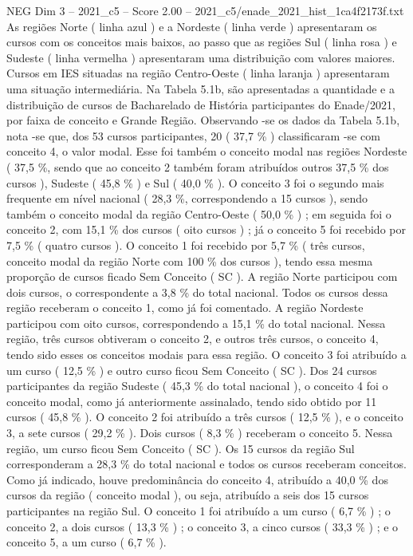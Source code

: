\begin{textsample}{NEG Dim 3 – 2021\_c5 – Score 2.00 – 2021\_c5/enade\_2021\_hist\_1ca4f2173f.txt}
As regiões Norte ( linha azul ) e a Nordeste ( linha verde ) apresentaram os cursos com os conceitos mais baixos, ao passo que as regiões Sul ( linha rosa ) e Sudeste ( linha vermelha ) apresentaram uma distribuição com valores maiores.
Cursos em IES situadas na região Centro-Oeste ( linha laranja ) apresentaram uma situação intermediária.
Na Tabela 5.1b, são apresentadas a quantidade e a distribuição de cursos de Bacharelado de História participantes do Enade/2021, por faixa de conceito e Grande Região.
Observando -se os dados da Tabela 5.1b, nota -se que, dos 53 cursos participantes, 20 ( 37,7 \% ) classificaram -se com conceito 4, o valor modal.
Esse foi também o conceito modal nas regiões Nordeste ( 37,5 \%, sendo que ao conceito 2 também foram atribuídos outros 37,5 \% dos cursos ), Sudeste ( 45,8 \% ) e Sul ( 40,0 \% ).
O conceito 3 foi o segundo mais frequente em nível nacional ( 28,3 \%, correspondendo a 15 cursos ), sendo também o conceito modal da região Centro-Oeste ( 50,0 \% ) ; em seguida foi o conceito 2, com 15,1 \% dos cursos ( oito cursos ) ; já o conceito 5 foi recebido por 7,5 \% ( quatro cursos ).
O conceito 1 foi recebido por 5,7 \% ( três cursos, conceito modal da região Norte com 100 \% dos cursos ), tendo essa mesma proporção de cursos ficado Sem Conceito ( SC ).
A região Norte participou com dois cursos, o correspondente a 3,8 \% do total nacional.
Todos os cursos dessa região receberam o conceito 1, como já foi comentado.
A região Nordeste participou com oito cursos, correspondendo a 15,1 \% do total nacional.
Nessa região, três cursos obtiveram o conceito 2, e outros três cursos, o conceito 4, tendo sido esses os conceitos modais para essa região.
O conceito 3 foi atribuído a um curso ( 12,5 \% ) e outro curso ficou Sem Conceito ( SC ).
Dos 24 cursos participantes da região Sudeste ( 45,3 \% do total nacional ), o conceito 4 foi o conceito modal, como já anteriormente assinalado, tendo sido obtido por 11 cursos ( 45,8 \% ).
O conceito 2 foi atribuído a três cursos ( 12,5 \% ), e o conceito 3, a sete cursos ( 29,2 \% ).
Dois cursos ( 8,3 \% ) receberam o conceito 5.
Nessa região, um curso ficou Sem Conceito ( SC ).
Os 15 cursos da região Sul corresponderam a 28,3 \% do total nacional e todos os cursos receberam conceitos.
Como já indicado, houve predominância do conceito 4, atribuído a 40,0 \% dos cursos da região ( conceito modal ), ou seja, atribuído a seis dos 15 cursos participantes na região Sul.
O conceito 1 foi atribuído a um curso ( 6,7 \% ) ; o conceito 2, a dois cursos ( 13,3 \% ) ; o conceito 3, a cinco cursos ( 33,3 \% ) ; e o conceito 5, a um curso ( 6,7 \% ).

\end{textsample}
